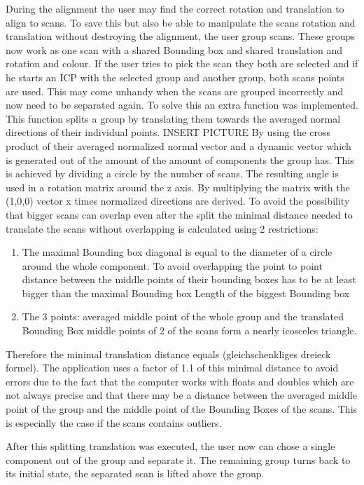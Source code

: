 \documentclass[hyperref,english,bachelorofscience,bibnum]{cgvpub}
\begin{document}
During the alignment the user may find the correct rotation and translation to align to scans. To save this but also be able to manipulate the scans rotation and translation without destroying the alignment, the user group scans. These groups now work as one scan with a shared Bounding box and shared translation and rotation and colour. If the user tries to pick the scan they both are selected and if he starts an ICP with the selected group and another group, both scans points are used.
This may come unhandy when the scans are grouped incorrectly and now need to be separated again. To solve this an extra function was implemented. This function splits a group by translating them towards the averaged normal directions of their individual points.
INSERT PICTURE
By using the cross product of their averaged normalized normal vector and a dynamic vector which is generated out of the amount of the amount of components the group has.
This is achieved by dividing a circle by the number of scans. The resulting angle is used in a rotation matrix around the z axis. By multiplying the matrix with the (1,0,0) vector x times normalized directions are derived.
To avoid the possibility that bigger scans can overlap even after the split the minimal distance needed to translate the scans without overlapping is calculated using 2 restrictions:
\begin{enumerate}
\item The maximal Bounding box diagonal is equal to the diameter of a circle around the whole component. To avoid overlapping the point to point distance between the middle points of their bounding boxes has to be at least bigger than the maximal Bounding box Length of the biggest Bounding box
\item The 3 points: averaged middle point of the whole group and the translated Bounding Box middle points of 2 of the scans form a nearly icosceles triangle.
\end{enumerate}
Therefore the minimal translation distance equals (gleichschenkliges dreieck formel).
The application uses a factor of 1.1 of this minimal distance to avoid errors due to the fact that the computer works with floats and doubles which are not always precise and that there may be a distance between the averaged middle point of the group and the middle point of the Bounding Boxes of the scans. This is especially the case if the scans contains outliers.

After this splitting translation was executed, the user now can chose a single component out of the group and separate it. The remaining group turns back to its initial state, the separated scan is lifted above the group.
\end{document}
